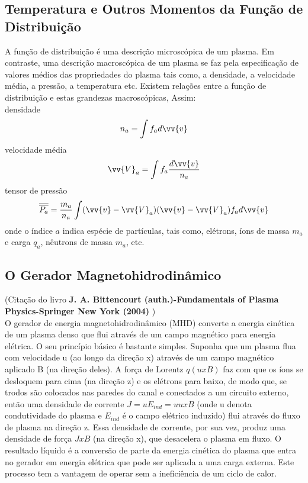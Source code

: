 \documentclass[12pt,oneside,a4paper]{abntex2}
\theoremstyle{definition}  %
\begin{document}
\subsection{Temperatura e Outros Momentos da Função de Distribuição}
A função de distribuição é uma descrição microscópica de um plasma. Em contraste, uma descrição macroscópica de um plasma se faz pela especificação de valores médios das propriedades do plasma tais como, a densidade, a velocidade média, a pressão, a temperatura etc.
Existem relações entre a função de distribuição e estas grandezas macroscópicas, Assim:\\
densidade
\begin{equation}
    n_a = \int f_a d\vv{v}
\end{equation}
velocidade média
\begin{equation}
    \vv{V}_a = \int f_a \frac{d\vv{v}}{n_a}
\end{equation}
tensor de pressão
\begin{equation}
    \overline{\overline{P_a}} = \frac{m_a}{n_a}\int (\vv{v}-\vv{V}_a)(\vv{v}-\vv{V}_a) f_a d\vv{v}
\end{equation}
onde o índice $a$ indica espécie de partículas, tais como, elétrons, íons de massa $m_a$ e carga $q_a$, nêutrons de massa $m_a$, etc.
\subsection{O Gerador Magnetohidrodinâmico}
(Citação do livro \textbf{J. A. Bittencourt  (auth.)-Fundamentals of Plasma Physics-Springer New York (2004)} )\\
O gerador de energia magnetohidrodinâmico (MHD) converte a energia cinética de um plasma denso que flui através de um campo magnético para
energia elétrica. O seu princípio básico é bastante simples.
Suponha que um plasma flua com velocidade u (ao longo da direção x) através de um campo magnético aplicado B (na direção deles). A força de Lorentz $q (u x B)$ faz com que os íons se desloquem
para cima (na direção z) e os elétrons para baixo, de modo que, se
trodos são colocados nas paredes do canal e conectados a um circuito externo, então uma densidade de corrente $J = uE_{ind} = uu x B$ (onde u denota condutividade do plasma e $E_{ind}$ é o campo elétrico induzido) flui através do fluxo de plasma na direção z. Essa densidade de corrente, por sua vez, produz uma densidade de força $J x B$ (na direção x), que desacelera o plasma em fluxo. O resultado líquido é a conversão de parte da energia cinética do plasma que entra no gerador em energia elétrica que pode ser aplicada a
uma carga externa. Este processo tem a vantagem de operar sem a ineficiência de um ciclo de calor.
\end{document}

